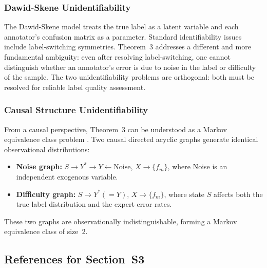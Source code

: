 \subsubsection{Dawid-Skene Unidentifiability}

The Dawid-Skene model \cite{dawid1979maximum} treats the true label as a latent
variable and each annotator's confusion matrix as a parameter.  Standard
identifiability issues include label-switching symmetries.  Theorem~3 addresses
a different and more fundamental ambiguity: even after resolving
label-switching, one cannot distinguish whether an annotator's error is due to
noise in the label or difficulty of the sample.  The two unidentifiability
problems are orthogonal: both must be resolved for reliable label quality
assessment.

\subsubsection{Causal Structure Unidentifiability}

From a causal perspective, Theorem~3 can be understood as a Markov equivalence
class problem \cite{pearl2009causality}.  Two causal directed acyclic graphs
generate identical observational distributions:
\begin{itemize}
  \item \textbf{Noise graph:} $S\to Y^*\to Y\leftarrow\text{Noise}$,
    $X\to\{f_m\}$, where Noise is an independent exogenous variable.
  \item \textbf{Difficulty graph:} $S\to Y^*(=Y)$, $X\to\{f_m\}$, where state
    $S$ affects both the true label distribution and the expert error rates.
\end{itemize}
These two graphs are observationally indistinguishable, forming a
Markov equivalence class of size~2.

\subsection*{References for Section~S3}

